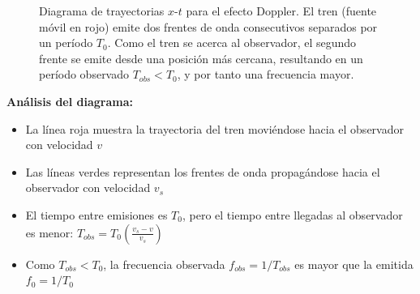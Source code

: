 \documentclass[
  11pt,
  letterpaper,
   addpoints,
   answers
  ]{exam}
\begin{document}
\begin{questions}
\begin{solution}
\begin{figure}[H]
\caption{Diagrama de trayectorias $x$-$t$ para el efecto Doppler. El tren (fuente móvil en rojo) emite dos frentes de onda consecutivos separados por un período $T_0$. Como el tren se acerca al observador, el segundo frente se emite desde una posición más cercana, resultando en un período observado $T_{obs} < T_0$, y por tanto una frecuencia mayor.}
\end{figure}

\textbf{Análisis del diagrama:}
\begin{itemize}
    \item La línea roja muestra la trayectoria del tren moviéndose hacia el observador con velocidad $v$
    \item Las líneas verdes representan los frentes de onda propagándose hacia el observador con velocidad $v_s$
    \item El tiempo entre emisiones es $T_0$, pero el tiempo entre llegadas al observador es menor: $T_{obs} = T_0\left(\frac{v_s - v}{v_s}\right)$
    \item Como $T_{obs} < T_0$, la frecuencia observada $f_{obs} = 1/T_{obs}$ es mayor que la emitida $f_0 = 1/T_0$
\end{itemize}

\end{solution}
\end{questions}
\end{document}
